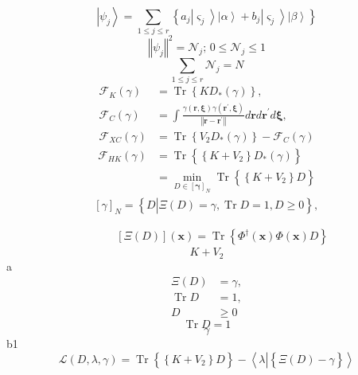 \documentclass[aps,preprint]{revtex4}%
\begin{document}
\[
\left\vert \psi_{j}\right\rangle =\sum_{1\leq j\leq r}\left\{  a_{j}\left\vert
\varsigma_{j}\right\rangle \left\vert \alpha\right\rangle +b_{j}\left\vert
\varsigma_{j}\right\rangle \left\vert \beta\right\rangle \right\}
\]%
\[
\left\Vert \psi_{j}\right\Vert ^{2}=\mathcal{N}_{j};\,0\leq\mathcal{N}_{j}%
\leq1
\]%
\[
\sum_{1\leq j\leq r}\mathcal{N}_{j}=N
\]%
\begin{align*}
\mathcal{F}_{K}\left(  \gamma\right)   &  =\operatorname{Tr}\left\{  KD_{\ast
}\left(  \gamma\right)  \right\}  ,\\
\mathcal{F}_{C}\left(  \gamma\right)   &  =\int\frac{\gamma\left(
\mathbf{r,\xi}\right)  \gamma\left(  \mathbf{r}^{\prime}\mathbf{,\xi}\right)
}{\left\Vert \mathbf{r-r}^{\prime}\right\Vert }d\mathbf{r}d\mathbf{r}^{\prime
}d\mathbf{\xi},\\
\mathcal{F}_{XC}\left(  \gamma\right)   &  =\operatorname{Tr}\left\{
V_{2}D_{\ast}\left(  \gamma\right)  \right\}  -\mathcal{F}_{C}\left(
\gamma\right)
\end{align*}%
\begin{align*}
\mathcal{F}_{HK}\left(  \gamma\right)   &  =\operatorname{Tr}\left\{
\overset{}{\left\{  K+V_{2}\right\}  D_{\ast}\left(  \gamma\right)  }\right\}
\\
&  =\min_{D\in\left[  \mathbf{\gamma}\right]  _{N}}\operatorname{Tr}\left\{
\overset{}{\left\{  K+V_{2}\right\}  D}\right\}
\end{align*}%
\begin{align*}
&  \left[  \gamma\right]  _{N}=\left\{  \left.  \overset{}{D}\right\vert
\Xi\left(  D\right)  =\gamma,\operatorname{Tr}D=1,D\geq0\right\}  ,\\
& \\
& \\
&  \qquad\left[  \Xi\left(  D\right)  \right]  \left(  \mathbf{x}\right)
=\operatorname{Tr}\left\{  \Phi^{\dagger}\left(  \mathbf{x}\right)
\Phi\left(  \mathbf{x}\right)  D\right\}
\end{align*}%
\[
K+V_{2}%
\]
a%
\begin{align*}
\Xi\left(  D\right)   &  =\gamma,\\
\operatorname{Tr}D  &  =1,\\
D  &  \geq0
\end{align*}%
\[
\operatorname{Tr}D=1
\]%
\[
\gamma
\]
b1%
\[
\mathcal{L}\left(  D,\lambda,\gamma\right)  =\operatorname{Tr}\left\{
\overset{}{\left\{  K+V_{2}\right\}  D}\right\}  -\left\langle \lambda
\left\vert \left\{  \overset{}{\Xi\left(  D\right)  -\gamma}\right\}  \right.
\right\rangle
\]
\end{document}
